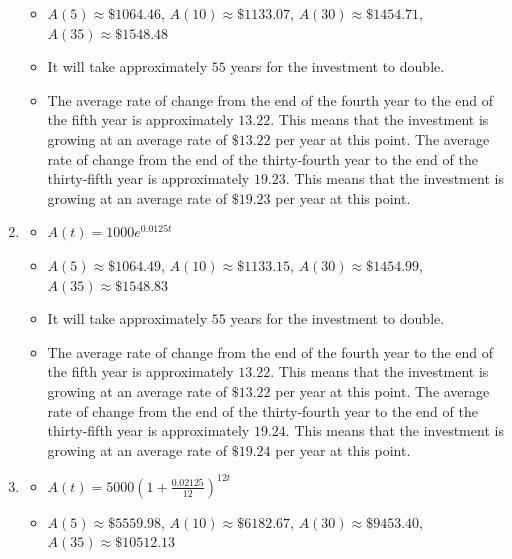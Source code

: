\begin{enumerate}
\begin{itemize}
\item $A(5) \approx \$ 1064.46$, $A(10) \approx \$ 1133.07$, $A(30) \approx \$ 1454.71$, $A(35) \approx \$ 1548.48$ 

\item  It will take approximately $55$ years for the investment to double.

\item  The average rate of change from the end of the fourth year to the end of the fifth year is approximately $13.22$.  This means that the investment is growing at an average rate of $\$13.22$ per year at this point.  The average rate of change from the end of the thirty-fourth year to the end of the thirty-fifth year is approximately $19.23$.  This means that the investment is growing at an average rate of $\$19.23$ per year at this point. 

\end{itemize}



\item \begin{itemize}  \item $A(t) = 1000e^{0.0125t}$ 

\item $A(5) \approx \$ 1064.49$, $A(10) \approx \$ 1133.15$, $A(30) \approx \$ 1454.99$, $A(35) \approx \$ 1548.83$ 

\item It will take approximately $55$ years for the investment to double.

\item  The average rate of change from the end of the fourth year to the end of the fifth year is approximately $13.22$.  This means that the investment is growing at an average rate of $\$13.22$ per year at this point.  The average rate of change from the end of the thirty-fourth year to the end of the thirty-fifth year is approximately $19.24$.  This means that the investment is growing at an average rate of $\$19.24$ per year at this point. 

\end{itemize}

\pagebreak

\item \begin{itemize}  \item $A(t) = 5000\left(1 + \frac{0.02125}{12}\right)^{12t}$ 

\item $A(5) \approx \$ 5559.98$, $A(10) \approx \$ 6182.67$, $A(30) \approx \$ 9453.40$, $A(35) \approx \$ 10512.13$ 


\end{itemize}
\end{enumerate}
